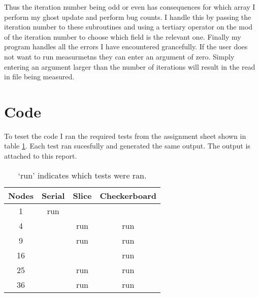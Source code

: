 \documentclass[11pt,a4paper,oneside]{report}
\begin{document}
Thus the iteration number being odd or even has consequences for which array I perform my ghost update and perform bug counts.  
I handle this by passing the iteration number to these subroutines and using a tertiary operator on the mod of the iteration number to choose which field is the relevant one.
Finally my program handles all the errors I have encountered grancefully.
If the user does not want to run measurmetns they can enter an argument of zero.
Simply entering an argument larger than the number of iterations will result in the read in file being measured.

\section{Code}
To teset the code I ran the required tests from the assignment sheet shown in table \ref{runs}.
Each test ran sucesfully and generated the same output.  
The output is attached to this report.
\begin{table}
  \centering
  \begin{tabular}{|c|c|c|c|}
    \hline
    Nodes & Serial & Slice & Checkerboard \\
    \hline
        1 & run & & \\
        4 & & run & run \\
        9 & & run & run \\
       16 & & & run \\
       25 & & run & run \\
       36 & & run & run \\
    \hline
  \end{tabular}
  \caption{`run' indicates which tests were ran.}
  \label{runs}
\end{table}
\end{document}
